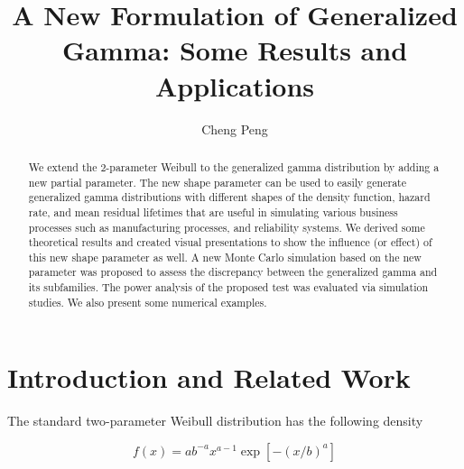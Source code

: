 \documentclass{ps}
\theoremstyle{plain}%
\theoremstyle{definition}
\theoremstyle{remark}
\begin{document}
\title{A New Formulation of Generalized Gamma: Some Results and Applications} %
%
\author{Cheng Peng}\address{Department of Mathematics, West Chester University, West Chester, PA, 19383 USA}
%
%
\begin{abstract}  
		We extend the 2-parameter Weibull to the generalized gamma distribution by adding a new partial parameter. The new shape parameter can be used to easily generate generalized gamma distributions with different shapes of the density function, hazard rate, and mean residual lifetimes that are useful in simulating various business processes such as manufacturing processes, and reliability systems. We derived some theoretical results and created visual presentations to show the influence (or effect) of this new shape parameter as well. A new Monte Carlo simulation based on the new parameter was proposed to assess the discrepancy between the generalized gamma and its subfamilies. The power analysis of the proposed test was evaluated via simulation studies. We also present some numerical examples.
\end{abstract}
%
%
%
%
\maketitle
\section{Introduction and Related Work}
The standard two-parameter Weibull distribution has the following density   

\begin{equation}\label{Weibull-dist}
	f(x) = ab^{-a}x^{a-1}\exp[-(x/b)^a]
\end{equation}
\end{document}
